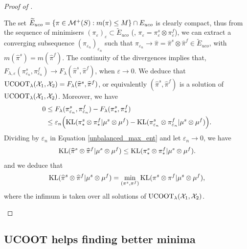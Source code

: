 \begin{proof}[Proof of ]
\begin{enumerate}
    The set $\widetilde{E}_{uco} = \{\pi \in \mathcal M^+(S): m(\pi) \leq M\} \cap E_{uco}$
    is clearly compact, thus from the sequence of minimisers
    $(\pi_{\varepsilon})_{\varepsilon} \subset \widetilde{E}_{uco}$
    (\ie, $\pi_{\varepsilon} = \pi_{\varepsilon}^s \otimes \pi_{\varepsilon}^f$), we can extract a
    converging subsequence $(\pi_{\varepsilon_n})_{\varepsilon_n}$ such that
    $\pi_{\varepsilon_n} \to \widehat{\pi} = \widehat{\pi}^s \otimes \widehat{\pi}^f \in \widetilde{E}_{uco}$,
    with $m(\widehat{\pi}^s) = m(\widehat{\pi}^f)$.
    The continuity of the divergences implies that,
    $F_{\lambda, \varepsilon}(\pi_{\varepsilon_n}^s, \pi_{\varepsilon_n}^f) \to
    F_{\lambda}(\widehat{\pi}^s, \widehat{\pi}^f)$, when $\varepsilon \to 0$. We deduce that
    $\text{UCOOT}_{\lambda}(\mathcal X_1, \mathcal X_2) = F_{\lambda}(\widehat{\pi}^s, \widehat{\pi}^f)$,
    or equivalently $(\widehat{\pi}^s, \widehat{\pi}^f)$
    is a solution of $\text{UCOOT}_{\lambda}(\mathcal X_1, \mathcal X_2)$. Moreover, we have
    \begin{equation} \label{unbalanced_max_ent}
      \begin{split}
        0 &\leq F_{\lambda}(\pi_{\varepsilon_n}^s, \pi_{\varepsilon_n}^f)
        - F_{\lambda}(\pi_*^s, \pi_*^f) \\
      &\leq \varepsilon_n \Big( \text{KL}(\pi_*^s \otimes \pi_*^f \vert \mu^s \otimes \mu^f) -
      \text{KL}(\pi_{\varepsilon_n}^s \otimes \pi_{\varepsilon_n}^f \vert \mu^s \otimes \mu^f) \Big).
      \end{split}
    \end{equation}
    Dividing by $\varepsilon_n$ in Equation \eqref{unbalanced_max_ent} and let
    $\varepsilon_n \to 0$, we have
    \begin{equation}
      \text{KL}(\widehat{\pi}^s \otimes \widehat{\pi}^f \vert \mu^s \otimes \mu^f) \leq
      \text{KL}(\pi_*^s \otimes \pi_*^f \vert \mu^s \otimes \mu^f).
    \end{equation}
    and we deduce that
    \begin{equation}
      \text{KL}(\widehat{\pi}^s \otimes \widehat{\pi}^f \vert \mu^s \otimes \mu^f) =
      \min_{(\pi^s, \pi^f)} \text{KL}(\pi^s \otimes \pi^f \vert \mu^s \otimes \mu^f),
    \end{equation}
    where the infimum is taken over all solutions of $\text{UCOOT}_{\lambda}(\mathcal X_1, \mathcal X_2)$.
  \end{enumerate}
\end{proof}

\subsection{UCOOT helps finding better minima}

